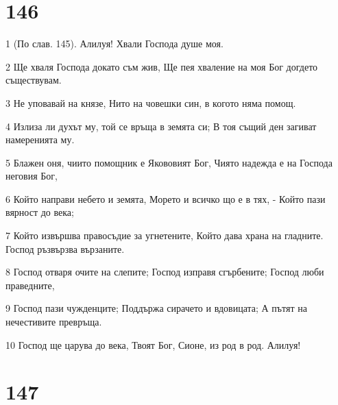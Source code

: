 \chapter{146}

\par 1 (По слав. 145). Алилуя! Хвали Господа душе моя.
\par 2 Ще хваля Господа докато съм жив, Ще пея хваление на моя Бог догдето съществувам.
\par 3 Не уповавай на князе, Нито на човешки син, в когото няма помощ.
\par 4 Излиза ли духът му, той се връща в земята си; В тоя същий ден загиват намеренията му.
\par 5 Блажен оня, чиито помощник е Якововият Бог, Чиято надежда е на Господа неговия Бог,
\par 6 Който направи небето и земята, Морето и всичко що е в тях, - Който пази вярност до века;
\par 7 Който извършва правосъдие за угнетените, Който дава храна на гладните. Господ ръзвързва вързаните.
\par 8 Господ отваря очите на слепите; Господ изправя сгърбените; Господ люби праведните,
\par 9 Господ пази чужденците; Поддържа сирачето и вдовицата; А пътят на нечестивите превръща.
\par 10 Господ ще царува до века, Твоят Бог, Сионе, из род в род. Алилуя!

\chapter{147}

